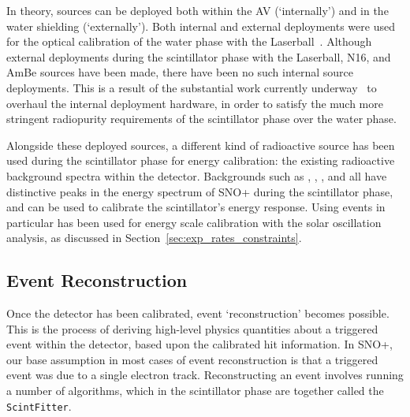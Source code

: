 In theory, sources can be deployed both within the AV (`internally') and in the water shielding (`externally'). Both internal and external deployments were used for the optical calibration of the water phase with the Laserball~\cite{andersonOpticalCalibrationSNO2021}. Although external deployments during the scintillator phase with the Laserball, N16, and AmBe sources have been made, there have been no such internal source deployments. This is a result of the substantial work currently underway~\cite{valderLaserballCalibrationDevice} to overhaul the internal deployment hardware, in order to satisfy the much more stringent radiopurity requirements of the scintillator phase over the water phase.

Alongside these deployed sources, a different kind of radioactive source has been used during the scintillator phase for energy calibration: the existing radioactive background spectra within the detector. Backgrounds such as , , , and  all have distinctive peaks in the energy spectrum of SNO+ during the scintillator phase, and can be used to calibrate the scintillator's energy response. Using  events in particular has been used for energy scale calibration with the solar oscillation analysis, as discussed in Section~\ref{sec:exp_rates_constraints}.

\subsection{Event Reconstruction}\label{sec:ev_reco}
Once the detector has been calibrated, event `reconstruction' becomes possible. This is the process of deriving high-level physics quantities about a triggered event within the detector, based upon the calibrated hit information. In SNO+, our base assumption in most cases of event reconstruction is that a triggered event was due to a single electron track. Reconstructing an event involves running a number of algorithms, which in the scintillator phase are together called the \texttt{ScintFitter}.

